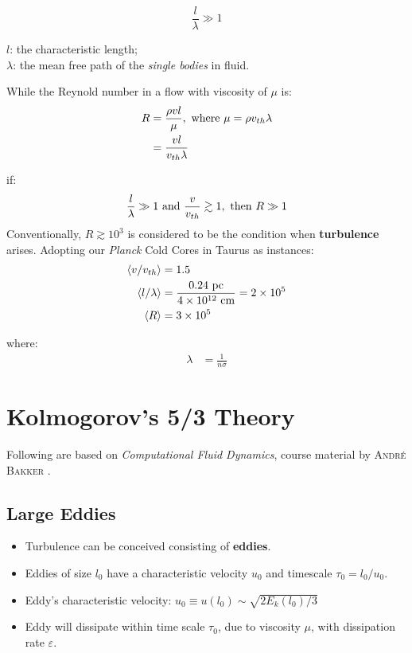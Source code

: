 \documentclass[12pt]{article}
\begin{document}
    \begin{equation}
        \frac{l}{\lambda} \gg 1
    \end{equation}

    $l$: the characteristic length; \\
    $\lambda$: the mean free path of the \emph{single bodies} in fluid.

    While the Reynold number in a flow with viscosity of $\mu$ is:
    \begin{align} 
        R& = \frac{\rho v l }{\mu} {,\ \rm where\ } 
        \mu = \rho v_{th} \lambda\\
        &=\frac{vl}{v_{th}\lambda}
    \end{align}

    if:
    \begin{align} 
        \frac{l}{\lambda} \gg 1 {\ \rm and\ } 
        \frac{v}{v_{th}}\gtrsim 1{,\ \rm then\ } 
        R\gg 1
    \end{align}
    Conventionally, $R\gtrsim 10^{3}$ is considered to be the condition when \textbf{turbulence} arises.
    Adopting our \emph{Planck} Cold Cores in Taurus as instances:
    \begin{align}
        \langle {v}/{v_{th}} \rangle &= 1.5\\
        \langle {l}/{\lambda} \rangle & = \frac{0.24\ {\rm pc}}{4\times10^{12}\ {\rm cm}} = 2\times10^{5}\\
        \langle R \rangle &= 3\times10^{5}
    \end{align}
    
    where:
    \begin{align}
        \lambda &  = \frac{1}{n\sigma}
    \end{align}
    \clearpage
\section{Kolmogorov's 5/3 Theory} %
Following are based on \emph{Computational Fluid Dynamics}, course material by \textsc{Andr\'{e} Bakker
}.
\label{sec:kolmogorov_s_5_3_theory}
    \subsection{Large Eddies} %
    \label{sub:eddies}
        \begin{itemize}
            \item Turbulence can be conceived consisting of \textbf{eddies}.
            \item Eddies of size $l_0$ have a characteristic velocity $u_0$ and timescale $\tau_0=l_0/u_0$.
            \item Eddy's characteristic velocity: $u_0\equiv u(l_0)\sim \sqrt{2E_k(l_0)/3}$
            \item Eddy will dissipate within time scale $\tau_0$, due to viscosity $\mu$, with dissipation rate $\varepsilon$.
        \end{itemize}
\end{document}
